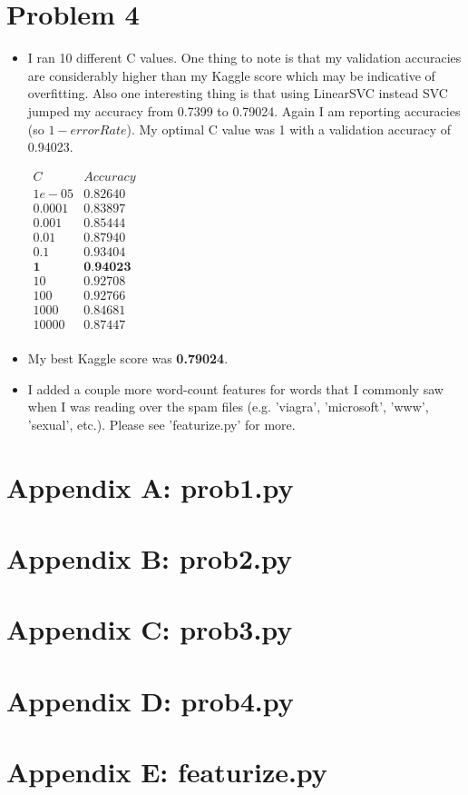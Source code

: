 \documentclass{article}
\begin{document}
\section*{Problem 4}
\begin{itemize}
  \item I ran 10 different C values. One thing to note is that my validation accuracies are considerably higher than my Kaggle score which may be indicative of overfitting. Also one interesting thing is that using LinearSVC instead SVC jumped my accuracy from 0.7399 to 0.79024. Again I am reporting accuracies (so $1- errorRate$). My optimal C value was 1 with a validation accuracy of 0.94023.
  \begin{center}
    $\begin{array}{cc}
       C        & Accuracy  \\
       1e-05    & 0.82640   \\
       0.0001   & 0.83897   \\
       0.001    & 0.85444         \\
       0.01     & 0.87940       \\
       0.1      & 0.93404        \\
       \textbf{1} & \textbf{0.94023} \\
       10       & 0.92708        \\
       100      & 0.92766        \\
       1000     & 0.84681        \\
       10000    & 0.87447        \\
    \end{array}$
  \end{center}

\item My best Kaggle score was \textbf{0.79024}.
  \item I added a couple more word-count features for words that I commonly saw when I was reading over the spam files (e.g. 'viagra', 'microsoft', 'www', 'sexual', etc.). Please see 'featurize.py' for more.
\end{itemize}

\pagebreak
\section*{Appendix A: prob1.py}

\pagebreak
\section*{Appendix B: prob2.py}

\pagebreak
\section*{Appendix C: prob3.py}

\pagebreak
\section*{Appendix D: prob4.py}

\pagebreak
\section*{Appendix E: featurize.py}

\end{document}

